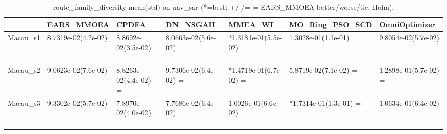 \begin{table}[t]
\centering
\caption{route_family_diversity mean(std) on uav_sar (*=best; +/-/= = EARS_MMOEA better/worse/tie, Holm).}
\label{tab:uav_sar_route_family_diversity}
\begin{tabular}{lllllll}
\toprule
 & EARS\_MMOEA & CPDEA & DN\_NSGAII & MMEA\_WI & MO\_Ring\_PSO\_SCD & OmniOptimizer \\
\midrule
Macau\_s1 & 8.7319e-02(4.2e-02) & 8.8692e-02(3.5e-02) = & 8.0663e-02(5.6e-02) = & *1.3181e-01(5.5e-02) = & 1.3028e-01(1.1e-01) = & 9.8054e-02(5.7e-02) = \\
Macau\_s2 & 9.0623e-02(7.6e-02) & 8.8263e-02(4.4e-02) = & 9.7306e-02(6.4e-02) = & *1.4719e-01(6.7e-02) = & 5.8719e-02(7.1e-02) = & 1.2898e-01(5.7e-02) = \\
Macau\_s3 & 9.3302e-02(5.7e-02) & 7.8970e-02(4.0e-02) = & 7.7686e-02(6.4e-02) = & 1.0026e-01(6.6e-02) = & *1.7314e-01(1.3e-01) = & 1.0634e-01(6.4e-02) = \\
\bottomrule
\end{tabular}
\end{table}
